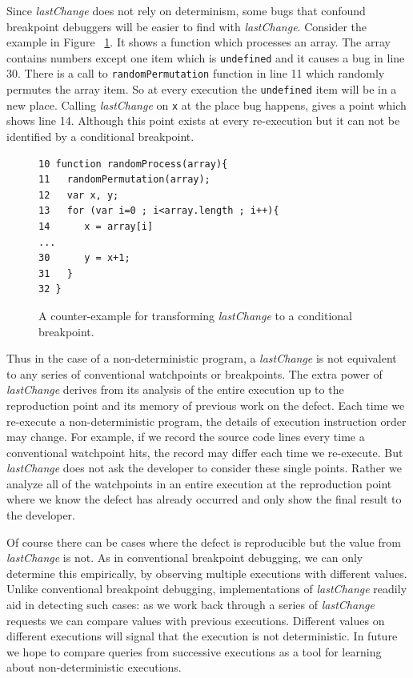 \documentclass[preprint]{sigplanconf}
\begin{document}
Since \textit{lastChange} does not rely on determinism, some bugs that
confound breakpoint debuggers will be easier to find with
\textit{lastChange}.  Consider the example in 
Figure ~\ref{fig:counter-example}. It shows a function which processes an
array. The array contains numbers except one item which is
\texttt{undefined} and it causes a bug in line 30. There is a call to
\texttt{randomPermutation} function in line 11 which randomly
permutes the array item. So at every execution the
\texttt{undefined} item will be in a new place. Calling
\textit{lastChange} on \texttt{x} at the place bug happens, gives a
point which shows line 14. Although this point exists at every
re-execution but it can not be identified by a conditional breakpoint.

\begin{figure}[htp]
\begin{verbatim}
10 function randomProcess(array){
11   randomPermutation(array);
12   var x, y;
13   for (var i=0 ; i<array.length ; i++){
14      x = array[i]
...
30      y = x+1;
31   }
32 }
\end{verbatim}
\caption{A counter-example for transforming \textit{lastChange} to a conditional breakpoint.}
\label{fig:counter-example}
\end{figure}
 

Thus in the case of a non-deterministic program, a \textit{lastChange}
is not equivalent to any series of conventional watchpoints or
breakpoints. The extra power of \textit{lastChange} derives from its
analysis of the entire execution up to the reproduction point and its
memory of previous work on the defect.  Each time we re-execute a
non-deterministic program, the details of execution instruction order
may change. For example, if we record the source code lines every time
a conventional watchpoint hits, the record may differ each time we
re-execute. But \textit{lastChange} does not ask the developer to
consider these single points.  Rather we analyze all of the
watchpoints in an entire execution at the reproduction point where we
know the defect has already occurred and only show the final result to
the developer.

Of course there can be cases where the defect is reproducible but the
value from \textit{lastChange} is not. As in conventional breakpoint
debugging, we can only determine this empirically, by observing
multiple executions with different values. Unlike conventional
breakpoint debugging, implementations of \textit{lastChange} readily
aid in detecting such cases: as we work back through a series of
\textit{lastChange} requests we can compare values with previous
executions. Different values on different executions will signal that
the execution is not deterministic. In future we hope to compare
queries from successive executions as a tool for learning about
non-deterministic executions.
\end{document}
